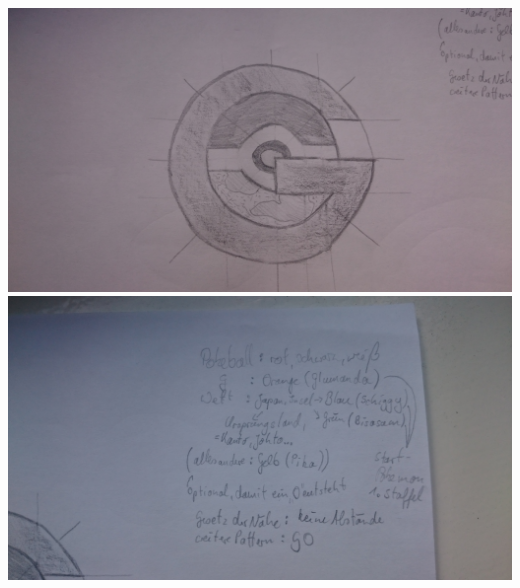 \documentclass{article}
\begin{document}
\includegraphics[scale=0.13]{DSC_0760.jpg}\\
\includegraphics[scale=0.13]{DSC_0761.jpg}\\


 
\end{document}

